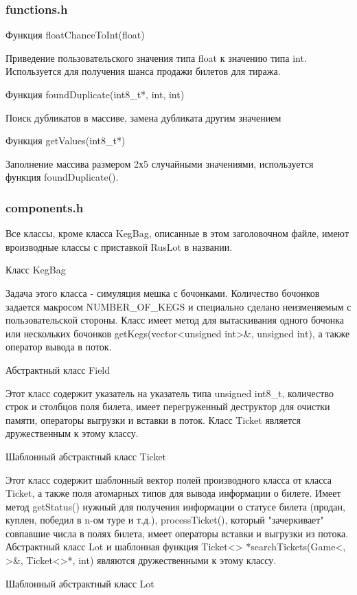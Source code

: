 \documentclass[a4paper,14pt]{article}
\begin{document}
\subsubsection{functions.h}
\begin{center}
   Функция floatChanceToInt(float)
\end{center}

Приведение пользовательского значения типа float к значению типа int. Используется для получения шанса продажи билетов для тиража.
\newpage
\begin{center}
   Функция foundDuplicate(int8\_t*, int, int)
\end{center}

Поиск дубликатов в массиве, замена дубликата другим значением
\begin{center}
   Функция getValues(int8\_t*)
\end{center}

Заполнение массива размером 2х5 случайными значениями, используется функция foundDuplicate().
\subsubsection{components.h}
Все классы, кроме класса KegBag, описанные в этом заголовочном файле, имеют вроизводные классы с приставкой RusLot в названии.
\begin{center}
   Класс KegBag
\end{center}

Задача этого класса - симуляция мешка с бочонками. Количество бочонков задается макросом NUMBER\_OF\_KEGS и специально сделано неизменяемым с пользовательской стороны. Класс имеет метод для вытаскивания одного бочонка или нескольких бочонков getKegs(vector<unsigned int>&, unsigned int), а также оператор вывода в поток.
\begin{center}
   Абстрактный класс Field
\end{center}

Этот класс содержит указатель на указатель типа unsigned int8\_t, количество строк и столбцов поля билета, имеет перегруженный деструктор для очистки памяти, операторы выгрузки и вставки в поток. Класс Ticket является дружественным к этому классу.
\begin{center}
   Шаблонный абстрактный класс Ticket
\end{center}

Этот класс содержит шаблонный вектор полей производного класса от класса Ticket, а также поля атомарных типов для вывода информации о билете. Имеет метод getStatus() нужный для получения информации о статусе билета (продан, куплен, победил в n-ом туре и т.д.), processTicket(), который "зачеркивает" совпавшие числа в полях билета, имеет операторы вставки и выгрузки из потока. Абстрактный класс Lot и шаблонная функция Ticket<> *searchTickets(Game<, >&, Ticket<>*, int) являются дружественными к этому классу.
\begin{center}
   Шаблонный абстрактный класс Lot
\end{center}
\end{document}
